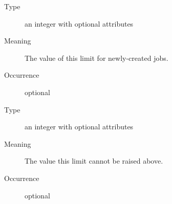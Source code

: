 \documentclass{ivoa}
\begin{document}
\begin{generated}
\begingroup\small\begin{bigdescription}\item[Element \xmlel{default}]
\begin{description}
\item[Type] an integer with optional attributes
\item[Meaning] The value of this limit for newly-created jobs.
\item[Occurrence] optional

\end{description}
\item[Element \xmlel{hard}]
\begin{description}
\item[Type] an integer with optional attributes
\item[Meaning] The value this limit cannot be raised above.
\item[Occurrence] optional

\end{description}


\end{bigdescription}\endgroup

\endgroup
\end{generated}

\end{document}

